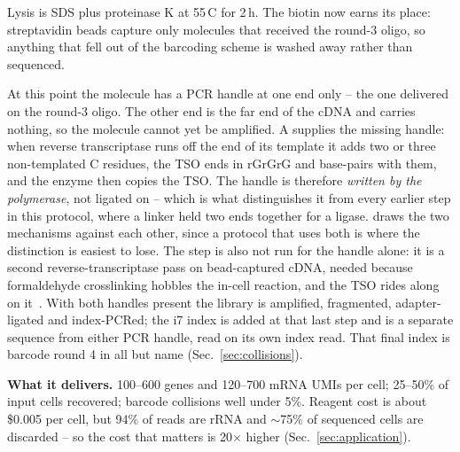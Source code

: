 Lysis is SDS plus proteinase K at 55\,\textdegree C for 2\,h. The biotin now
earns its place: streptavidin beads capture only molecules that received the
round-3 oligo, so anything that fell out of the barcoding scheme is washed away
rather than sequenced.

 At this point the molecule has a PCR
handle at one end only -- the one delivered on the round-3 oligo. The other end
is the far end of the cDNA and carries nothing, so the molecule cannot yet be
amplified. A  supplies the missing handle: when
reverse transcriptase runs off the end of its template it adds two or three
non-templated C residues, the TSO ends in rGrGrG and base-pairs with them, and the
enzyme then copies the TSO. The handle is therefore \emph{written by the
polymerase}, not ligated on -- which is what distinguishes it from every earlier
step in this protocol, where a linker held two ends together for a ligase.
 draws the two mechanisms against each other, since a
protocol that uses both is where the distinction is easiest to lose. The step is
also not run for the handle alone: it is a second reverse-transcriptase pass on
bead-captured cDNA, needed because formaldehyde crosslinking hobbles the in-cell
reaction, and the TSO rides along on
it~\citep{gaisserHighthroughputSinglecellTranscriptomics2024}. With
both handles present the library is amplified, fragmented, adapter-ligated and
index-PCRed; the i7 index is added at that last step and is a separate sequence
from either PCR handle, read on its own index read. That final index is barcode
round 4 in all but name (Sec.~\ref{sec:collisions}).

\begin{keybox}
\textbf{What it delivers.} 100--600 genes and 120--700 mRNA UMIs per cell; 25--50\%
of input cells recovered; barcode collisions well under 5\%. Reagent cost is about
\$0.005 per cell, but 94\% of reads are rRNA and $\sim$75\% of sequenced cells are
discarded -- so the cost that matters is 20$\times$ higher
(Sec.~\ref{sec:application}).
\end{keybox}

